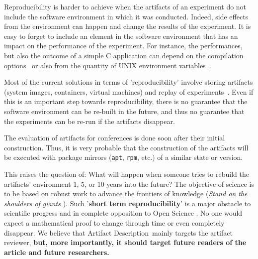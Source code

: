 \documentclass[sigconf,natbib=false]{acmart}
\newcommand{\repro}{reproducibility}
\newcommand{\ad}{Artifact Description}
\newcommand{\fmc}[1]{{\color{magenta} #1}} %
\begin{document}

Reproducibility is harder to achieve when the artifacts of an experiment do not include the software environment in which it was conducted.
Indeed, side effects from the environment can happen and change the results of the experiment.
It is easy to forget to include an element in the software environment that has an impact on the performance of the experiment.
For instance, the performances, but also the outcome of a simple C application can depend on the compilation options\ \cite{stodden2018assessing} or also from the quantity of UNIX environment variables\ \cite{mytkowicz2009producing}.

Most of the current solutions in terms of '\repro' involve storing artifacts (system images, containers, virtual machines) and replay of experiments\ \cite{rosendo2020e2clab, brammer2011paper, brinckman2019computing}.
Even if this is an important step towards \repro, there is no guarantee that the software environment can be re-built in the future, and thus no guarantee that the experiments can be re-run if the artifacts disappear. 

The evaluation of artifacts for conferences is done soon after their initial construction.
Thus, it is very probable that the construction of the artifacts will be executed with package mirrors (\texttt{apt}, \texttt{rpm}, etc.) of a similar state or version.

This raises the question of: What will happen when someone tries to rebuild the artifacts' environment 1, 5, or 10 years into the future?
The objective of science is to be based on robust work to advance the frontiers of knowledge (\emph{Stand on the shoulders of giants} \cite{giant}).
Such '\textbf{short term reproducibility}' is a major obstacle to scientific progress and in complete opposition to Open Science \cite{openscience_unesco}.
No one would expect a mathematical proof to change through time or even completely disappear.
We believe that \ad\ mainly targets the artifact reviewer, \textbf{but, more importantly, it should target future readers of the article and future researchers.}
\end{document}
